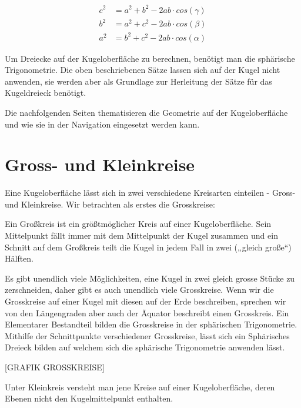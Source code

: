 \begin{refsection}
\begin{align*}
c^{ 2 } &= a^{ 2 } + b^{ 2 } - 2ab\cdot cos(\gamma)\\
b^{ 2 } &= a^{ 2 } + c^{ 2 } - 2ab\cdot cos(\beta)\\
a^{ 2 } &= b^{ 2 } + c^{ 2 } - 2ab\cdot cos(\alpha)
\end{align*}

Um Dreiecke auf der Kugeloberfläche zu berechnen, benötigt man die sphärische Trigonometrie. Die oben beschriebenen Sätze lassen sich auf der Kugel nicht anwenden, sie werden aber als Grundlage zur Herleitung der Sätze für das Kugeldreieck benötigt.

Die nachfolgenden Seiten thematisieren die Geometrie auf der Kugeloberfläche und wie sie in der Navigation eingesetzt werden kann.


\section{Gross- und Kleinkreise}

Eine Kugeloberfläche lässt sich in zwei verschiedene Kreisarten einteilen -  Gross- und Kleinkreise. 
Wir betrachten als erstes die Grosskreise:

\begin{definition}
Ein Großkreis ist ein größtmöglicher Kreis auf einer Kugeloberfläche. Sein Mittelpunkt fällt immer mit dem Mittelpunkt der Kugel zusammen und ein Schnitt auf dem Großkreis teilt die Kugel in jedem Fall in zwei („gleich große“) Hälften.
\end{definition}

Es gibt unendlich viele Möglichkeiten, eine Kugel in zwei gleich grosse Stücke zu zerschneiden, 
daher gibt es auch unendlich viele Grosskreise. Wenn wir die Grosskreise auf einer Kugel mit diesen auf der Erde beschreiben, sprechen wir von den Längengraden aber auch der Äquator beschreibt einen Grosskreis.
Ein Elementarer Bestandteil bilden die Grosskreise in der sphärischen Trigonometrie. Mithilfe der Schnittpunkte verschiedener Grosskreise, lässt sich ein Sphärisches Dreieck bilden auf welchem sich die sphärische Trigonometrie anwenden lässt.

[GRAFIK GROSSKREISE]

\begin{definition}
Unter Kleinkreis versteht man jene Kreise auf einer Kugeloberfläche, deren Ebenen nicht den Kugelmittelpunkt enthalten.
\end{definition}


\end{refsection}
